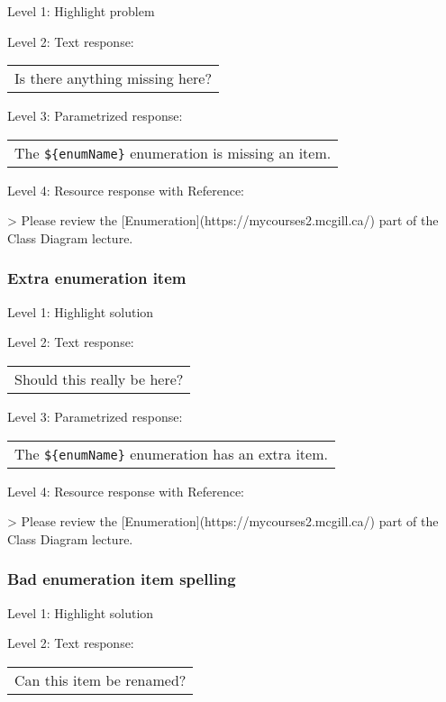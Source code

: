 \noindent Level 1: Highlight problem \medskip

\noindent Level 2: Text response: \medskip

\begin{tabular}{|c}
Is there anything missing here?
\end{tabular} \medskip

\noindent Level 3: Parametrized response: \medskip

\begin{tabular}{|c}
The \verb|${enumName}| enumeration is missing an item.
\end{tabular} \medskip

\noindent Level 4: Resource response with Reference:

> Please review the [Enumeration](https://mycourses2.mcgill.ca/) part of the Class Diagram lecture.


\subsubsection{Extra enumeration item}

\noindent Level 1: Highlight solution \medskip

\noindent Level 2: Text response: \medskip

\begin{tabular}{|c}
Should this really be here?
\end{tabular} \medskip

\noindent Level 3: Parametrized response: \medskip

\begin{tabular}{|c}
The \verb|${enumName}| enumeration has an extra item.
\end{tabular} \medskip

\noindent Level 4: Resource response with Reference:

> Please review the [Enumeration](https://mycourses2.mcgill.ca/) part of the Class Diagram lecture.


\subsubsection{Bad enumeration item spelling}

\noindent Level 1: Highlight solution \medskip

\noindent Level 2: Text response: \medskip

\begin{tabular}{|c}
Can this item be renamed?
\end{tabular} \medskip

